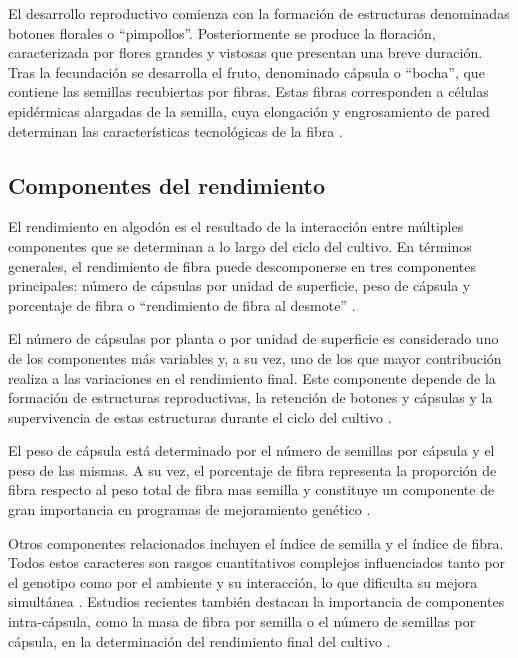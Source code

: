 \documentclass[12pt,oneside]{reedthesis}
\begin{document}
El desarrollo reproductivo comienza con la formación de estructuras denominadas botones florales o ``pimpollos''. Posteriormente se produce la floración, caracterizada por flores grandes y vistosas que presentan una breve duración. Tras la fecundación se desarrolla el fruto, denominado cápsula o ``bocha'', que contiene las semillas recubiertas por fibras. Estas fibras corresponden a células epidérmicas alargadas de la semilla, cuya elongación y engrosamiento de pared determinan las características tecnológicas de la fibra \autocite{basra1984,oosterhuis1999}.

\subsection{Componentes del rendimiento}\label{componentes-del-rendimiento}

El rendimiento en algodón es el resultado de la interacción entre múltiples componentes que se determinan a lo largo del ciclo del cultivo. En términos generales, el rendimiento de fibra puede descomponerse en tres componentes principales: número de cápsulas por unidad de superficie, peso de cápsula y porcentaje de fibra o ``rendimiento de fibra al desmote'' \autocite{constable2015}.

El número de cápsulas por planta o por unidad de superficie es considerado uno de los componentes más variables y, a su vez, uno de los que mayor contribución realiza a las variaciones en el rendimiento final. Este componente depende de la formación de estructuras reproductivas, la retención de botones y cápsulas y la supervivencia de estas estructuras durante el ciclo del cultivo \autocite{ritchie2007}.

El peso de cápsula está determinado por el número de semillas por cápsula y el peso de las mismas. A su vez, el porcentaje de fibra representa la proporción de fibra respecto al peso total de fibra mas semilla y constituye un componente de gran importancia en programas de mejoramiento genético \autocite{fang2017}.

Otros componentes relacionados incluyen el índice de semilla y el índice de fibra. Todos estos caracteres son rasgos cuantitativos complejos influenciados tanto por el genotipo como por el ambiente y su interacción, lo que dificulta su mejora simultánea \autocite{fang2017}. Estudios recientes también destacan la importancia de componentes intra-cápsula, como la masa de fibra por semilla o el número de semillas por cápsula, en la determinación del rendimiento final del cultivo \autocite{guo2023}.
\end{document}
